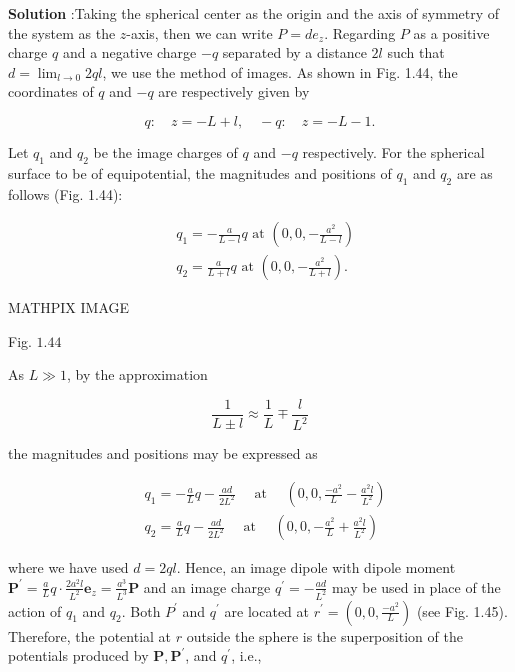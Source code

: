 \documentclass[10pt]{article}
\begin{document}
\textbf{Solution} :Taking the spherical center as the origin and the axis of symmetry of the system as the $z$-axis, then we can write $P=d e_{z}$. Regarding $P$ as a positive charge $q$ and a negative charge $-q$ separated by a distance $2 l$ such that $d=\lim _{l \rightarrow 0} 2 q l$, we use the method of images. As shown in Fig. 1.44, the coordinates of $q$ and $-q$ are respectively given by

$$
q: \quad z=-L+l, \quad-q: \quad z=-L-1 .
$$

Let $q_{1}$ and $q_{2}$ be the image charges of $q$ and $-q$ respectively. For the spherical surface to be of equipotential, the magnitudes and positions of $q_{1}$ and $q_{2}$ are as follows (Fig. 1.44):

$$
\begin{aligned}
&q_{1}=-\frac{a}{L-l} q \text { at }\left(0,0,-\frac{a^{2}}{L-l}\right) \\
&q_{2}=\frac{a}{L+l} q \text { at }\left(0,0,-\frac{a^{2}}{L+l}\right) .
\end{aligned}
$$

MATHPIX IMAGE

Fig. $1.44$

As $L \gg 1$, by the approximation

$$
\frac{1}{L \pm l} \approx \frac{1}{L} \mp \frac{l}{L^{2}}
$$

the magnitudes and positions may be expressed as

$$
\begin{aligned}
&q_{1}=-\frac{a}{L} q-\frac{a d}{2 L^{2}} \quad \text { at } \quad\left(0,0, \frac{-a^{2}}{L}-\frac{a^{2} l}{L^{2}}\right) \\
&q_{2}=\frac{a}{L} q-\frac{a d}{2 L^{2}} \quad \text { at } \quad\left(0,0,-\frac{a^{2}}{L}+\frac{a^{2} l}{L^{2}}\right)
\end{aligned}
$$

where we have used $d=2 q l$. Hence, an image dipole with dipole moment $\mathbf{P}^{\prime}=\frac{a}{L} q \cdot \frac{2 a^{2} l}{L^{2}} \mathbf{e}_{z}=\frac{a^{3}}{L^{3}} \mathbf{P}$ and an image charge $q^{\prime}=-\frac{a d}{L^{2}}$ may be used in place of the action of $q_{1}$ and $q_{2}$. Both $P^{\prime}$ and $q^{\prime}$ are located at $r^{\prime}=\left(0,0, \frac{-a^{2}}{L}\right)$ (see Fig. 1.45). Therefore, the potential at $r$ outside the sphere is the superposition of the potentials produced by $\mathbf{P}, \mathbf{P}^{\prime}$, and $q^{\prime}$, i.e.,
\end{document}
